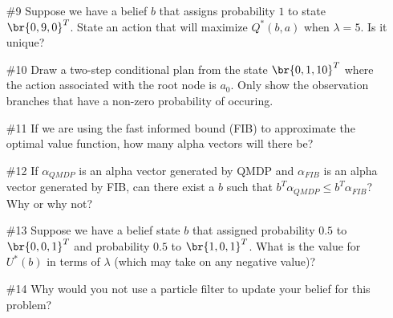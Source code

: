 \documentclass[12pt, oneside]{article}
\begin{document}
\begin{enumerate}
  \item[\#9]
    Suppose we have a belief $b$ that assigns probability $1$ to state $\br{0, 9, 0}^T$.
    State an action that will maximize $Q^*(b, a)$ when $\lambda = 5$.
    Is it unique?

  \item[\#10]
    Draw a two-step conditional plan from the state $\br{0, 1, 10}^T$ where the
    action associated with the root node is $a_0$.
    Only show the observation branches that have a non-zero probability of
    occuring.
    \begin{center}
    \end{center}

  \item[\#11]
    If we are using the fast informed bound (FIB) to approximate the optimal
    value function, how many alpha vectors will there be?

  \item[\#12]
    If $\alpha_{QMDP}$ is an alpha vector generated by QMDP and $\alpha_{FIB}$
    is an alpha vector generated by FIB, can there exist a $b$ such that
    $b^T \alpha_{QMDP} \le b^T \alpha_{FIB}$?
    Why or why not?

  \item[\#13]
    Suppose we have a belief state $b$ that assigned probability $0.5$ to
    $\br{0, 0, 1}^T$ and probability $0.5$ to $\br{1, 0, 1}^T$.
    What is the value for $U^*(b)$ in terms of $\lambda$ (which may take on any
    negative value)?

  \item[\#14] %
    Why would you not use a particle filter to update your belief for this
    problem?


\end{enumerate}
\end{document}
